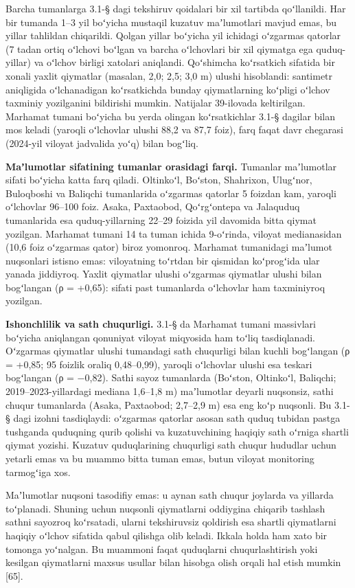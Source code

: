 \documentclass[14pt,a4paper,oneside]{extreport}
\begin{document}
Barcha tumanlarga 3.1-§ dagi tekshiruv qoidalari bir xil tartibda
qoʻllanildi. Har bir tumanda 1--3 yil boʻyicha mustaqil kuzatuv
maʼlumotlari mavjud emas, bu yillar tahlildan chiqarildi. Qolgan yillar
boʻyicha yil ichidagi oʻzgarmas qatorlar (7 tadan ortiq oʻlchovi boʻlgan
va barcha oʻlchovlari bir xil qiymatga ega quduq-yillar) va oʻlchov
birligi xatolari aniqlandi. Qoʻshimcha koʻrsatkich sifatida bir xonali
yaxlit qiymatlar (masalan, 2,0; 2,5; 3,0 m) ulushi hisoblandi: santimetr
aniqligida oʻlchanadigan koʻrsatkichda bunday qiymatlarning koʻpligi
oʻlchov taxminiy yozilganini bildirishi mumkin. Natijalar 39-ilovada
keltirilgan. Marhamat tumani boʻyicha bu yerda olingan koʻrsatkichlar
3.1-§ dagilar bilan mos keladi (yaroqli oʻlchovlar ulushi 88,2 va 87,7
foiz), farq faqat davr chegarasi (2024-yil viloyat jadvalida yoʻq) bilan
bogʻliq.

\textbf{Maʼlumotlar sifatining tumanlar orasidagi farqi.} Tumanlar
maʼlumotlar sifati boʻyicha katta farq qiladi. Oltinkoʻl, Boʻston,
Shahrixon, Ulugʻnor, Buloqboshi va Baliqchi tumanlarida oʻzgarmas
qatorlar 5 foizdan kam, yaroqli oʻlchovlar 96--100 foiz. Asaka,
Paxtaobod, Qoʻrgʻontepa va Jalaquduq tumanlarida esa quduq-yillarning
22--29 foizida yil davomida bitta qiymat yozilgan. Marhamat tumani 14 ta
tuman ichida 9-oʻrinda, viloyat medianasidan (10,6 foiz oʻzgarmas qator)
biroz yomonroq. Marhamat tumanidagi maʼlumot nuqsonlari istisno emas:
viloyatning toʻrtdan bir qismidan koʻprogʻida ular yanada jiddiyroq.
Yaxlit qiymatlar ulushi oʻzgarmas qiymatlar ulushi bilan bogʻlangan (ρ =
+0,65): sifati past tumanlarda oʻlchovlar ham taxminiyroq yozilgan.

\textbf{Ishonchlilik va sath chuqurligi.} 3.1-§ da Marhamat tumani
massivlari boʻyicha aniqlangan qonuniyat viloyat miqyosida ham toʻliq
tasdiqlanadi. Oʻzgarmas qiymatlar ulushi tumandagi sath chuqurligi bilan
kuchli bogʻlangan (ρ = +0,85; 95 foizlik oraliq 0,48--0,99), yaroqli
oʻlchovlar ulushi esa teskari bogʻlangan (ρ = −0,82). Sathi sayoz
tumanlarda (Boʻston, Oltinkoʻl, Baliqchi; 2019--2023-yillardagi mediana
1,6--1,8 m) maʼlumotlar deyarli nuqsonsiz, sathi chuqur tumanlarda
(Asaka, Paxtaobod; 2,7--2,9 m) esa eng koʻp nuqsonli. Bu 3.1-§ dagi
izohni tasdiqlaydi: oʻzgarmas qatorlar asosan sath quduq tubidan pastga
tushganda quduqning qurib qolishi va kuzatuvchining haqiqiy sath oʻrniga
shartli qiymat yozishi. Kuzatuv quduqlarining chuqurligi sath chuqur
hududlar uchun yetarli emas va bu muammo bitta tuman emas, butun viloyat
monitoring tarmogʻiga xos.

Maʼlumotlar nuqsoni tasodifiy emas: u aynan sath chuqur joylarda va
yillarda toʻplanadi. Shuning uchun nuqsonli qiymatlarni oddiygina
chiqarib tashlash sathni sayozroq koʻrsatadi, ularni tekshiruvsiz
qoldirish esa shartli qiymatlarni haqiqiy oʻlchov sifatida qabul
qilishga olib keladi. Ikkala holda ham xato bir tomonga yoʻnalgan. Bu
muammoni faqat quduqlarni chuqurlashtirish yoki kesilgan qiymatlarni
maxsus usullar bilan hisobga olish orqali hal etish mumkin {[}65{]}.
\end{document}
